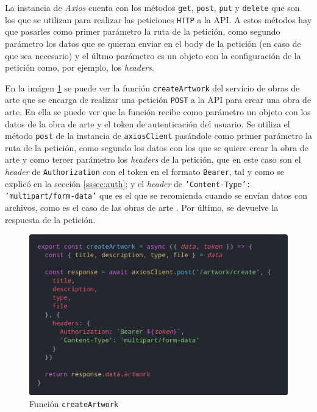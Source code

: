 La instancia de \textit{Axios} \cite{axios} cuenta con los métodos \texttt{get},
\texttt{post}, \texttt{put} y \texttt{delete} que son los que se utilizan para realizar
las peticiones \texttt{HTTP} a la API. A estos métodos hay que pasarles como primer
parámetro la ruta de la petición, como segundo parámetro los datos que se quieran enviar
en el body de la petición (en caso de que sea necesario) y el últmo parámetro es un objeto
con la configuración de la petición como, por ejemplo, los \textit{headers}.

En la imágen \ref{fig:create-artwork-service} se puede ver la función \texttt{createArtwork}
del servicio de obras de arte que se encarga de realizar una petición \texttt{POST} a la API
para crear una obra de arte. En ella se puede ver que la función recibe como parámetro un
objeto con los datos de la obra de arte y el token de autenticación del usuario. Se utiliza
el método \texttt{post} de la instancia de \texttt{axiosClient} pasándole como primer
parámetro la ruta de la petición, como segundo los datos con los que se quiere crear la obra
de arte y como tercer parámetro los \textit{headers} de la petición, que en este caso son
el \textit{header} de \texttt{Authorization} con el token en el formato \texttt{Bearer}, tal
y como se explicó en la sección \ref{sssec:auth}; y el \textit{header} de
\texttt{'Content-Type': 'multipart/form-data'} que es el que se recomienda cuando se envían
datos con archivos, como es el caso de las obras de arte \cite{multipart-form-data}. Por
último, se devuelve la respuesta de la petición.

\begin{figure}[H]
  \centering
  \includegraphics[width=1\textwidth]{img/create-artwork-service}
  \caption{Función \texttt{createArtwork}}
  \label{fig:create-artwork-service}
\end{figure}

